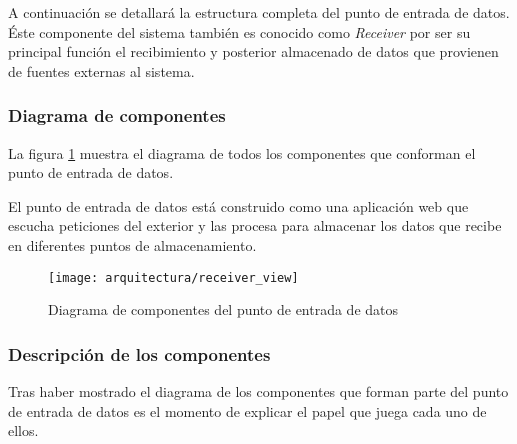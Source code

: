 A continuación se detallará la estructura completa del punto de entrada de datos.  Éste componente del sistema también es conocido como \textit{Receiver} por ser su principal función el recibimiento y posterior almacenado de datos que provienen de fuentes externas al sistema.


\subsubsection{Diagrama de componentes}
La figura \ref{fig:diagrama_componentes_receiver} muestra el diagrama de todos los componentes que conforman el punto de entrada de datos.

El punto de entrada de datos está construido como una aplicación web que escucha peticiones del exterior y las procesa para almacenar los datos que recibe en diferentes puntos de almacenamiento.
\begin{landscape}
	\begin{figure}[ht]
		\centering
		\texttt{[image: arquitectura/receiver\_view]}
		\caption{Diagrama de componentes del punto de entrada de datos}
		\label{fig:diagrama_componentes_receiver}
	\end{figure}
\end{landscape}


\subsubsection{Descripción de los componentes}
Tras haber mostrado el diagrama de los componentes que forman parte del punto de entrada de datos es el momento de explicar el papel que juega cada uno de ellos.

